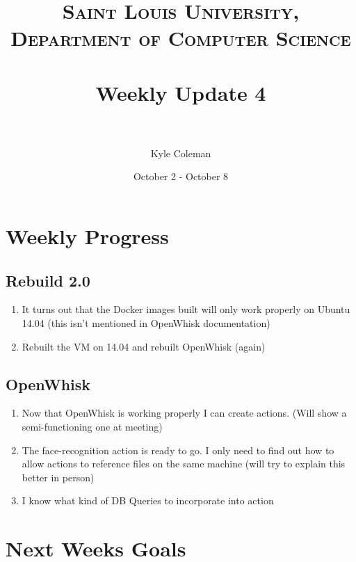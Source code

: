 \documentclass[paper=a4, fontsize=12pt]{scrartcl} %
\title{	
\normalfont \normalsize 
\textsc{Saint Louis University, Department of Computer Science} \\ [25pt] %
\horrule{0.5pt} \\[0.4cm] %
\huge Weekly Update 4\\ %
\horrule{2pt} \\[0.5cm] %
}
\author{Kyle Coleman} %
\date{October 2 - October 8} %
\numberwithin{equation}{section} %
\numberwithin{figure}{section} %
\numberwithin{table}{section} %
\begin{document}
\maketitle %


\section{Weekly Progress}





\subsection{Rebuild 2.0}
\begin{enumerate}
	\item It turns out that the Docker images built will only work properly on Ubuntu 14.04 (this isn't mentioned in OpenWhisk documentation)
    \item Rebuilt the VM on 14.04 and rebuilt OpenWhisk (again)
\end{enumerate}


\subsection{OpenWhisk}
\begin{enumerate}
	\item Now that OpenWhisk is working properly I can create actions. (Will show a semi-functioning one at meeting)
	\item The face-recognition action is ready to go. I only need to find out how to allow actions to reference files on the same machine (will try to explain this better in person)
	\item I know what kind of DB Queries to incorporate into action
\end{enumerate}




\section{Next Weeks Goals}
\end{document}
